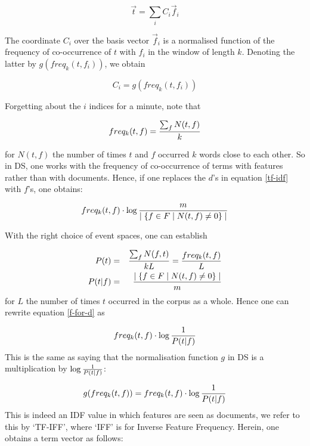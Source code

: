 \begin{equation}
\label{vector-word}
\overrightarrow{t}  = \sum_i  C_i  \overrightarrow{f}_i
\end{equation}

The coordinate $C_i$ over the basis vector $\overrightarrow{f}_i$ is a normalised function of the frequency of co-occurrence of $t$ with $f_i$ in the window of length $k$. Denoting the latter by  $g(freq_k(t,f_i))$, we obtain 

\begin{equation}
C_i = g(freq_k(t,f_i))
\end{equation}

Forgetting about the $i$ indices for a minute, note that 

\begin{equation}
freq_k(t,f) = {{\sum_f N(t,f)} \over {k}}
\end{equation}

for $N(t, f)$ the number of times $t$ and $f$ occurred  $k$ words close to each other.  So in DS, one works with the frequency of co-occurrence of terms with features rather than with documents. Hence, if one replaces the $d$'s in equation \ref{tf-idf} with $f$'s, one obtains:

\begin{equation}
\label{f-for-d}
freq_k(t, f) \cdot \log{{m} \over {\mid \{f \in F \mid N(t,f)  \neq 0 \}\mid}}
\end{equation}

With the right choice of event spaces, one can establish

\begin{eqnarray}
P(t) &=&  {{\sum_f N(f,t)} \over {kL}} = {{freq_k(t,f)} \over {L}}\\
P(t | f) &=&  {{\mid \{f \in F \mid N(t,f)  \neq 0 \}\mid} \over {m}}
\end{eqnarray}
for $L$ the number of times $t$ occurred in the corpus as a whole.  Hence one can rewrite equation \ref{f-for-d} as

\begin{equation}
freq_k(t,f) \cdot \log{1 \over P(t|f)}
\end{equation}
This is the same as saying that  the normalisation function $g$ in DS is a multiplication by $ \log{1 \over P(t|f)}$:

\[
g(freq_k(t, f)) = freq_k(t,f) \cdot \log{1 \over P(t|f)}
\]
This  is indeed an IDF value in which features are seen as documents, we refer to this by `TF-IFF', where `IFF' is for Inverse Feature Frequency. Herein, one obtains a term vector as follows:

